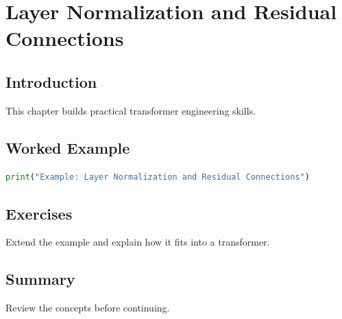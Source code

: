 \chapter{Layer Normalization and Residual Connections}
\label{chap:vol8-19}



\section{Introduction}
This chapter builds practical transformer engineering skills.

\section{Worked Example}
\begin{lstlisting}[language=Python]
print("Example: Layer Normalization and Residual Connections")
\end{lstlisting}

\section{Exercises}
\begin{exercise}
Extend the example and explain how it fits into a transformer.
\end{exercise}

\section{Summary}
Review the concepts before continuing.
